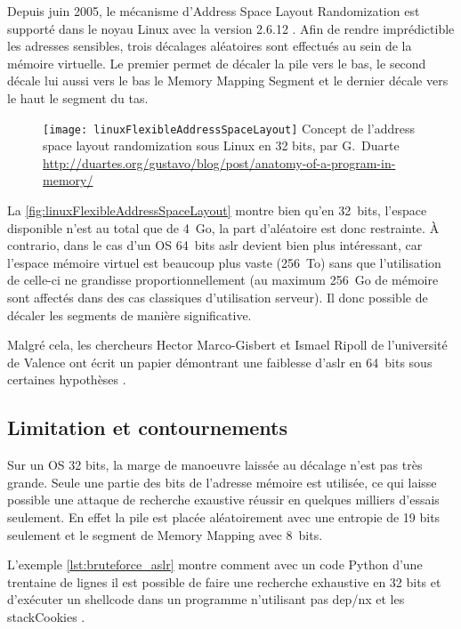 Depuis juin 2005, le mécanisme d'Address Space Layout Randomization est supporté dans le noyau Linux avec la version 2.6.12 \cite{AddressSpaceLayoutRandomizationFR, AddressSpaceLayoutRandomizationEN}. Afin de rendre imprédictible les adresses sensibles, trois décalages aléatoires sont effectués au sein de la mémoire virtuelle. Le premier permet de décaler la pile vers le bas, le second décale lui aussi vers le bas le \og Memory Mapping Segment \fg et le dernier décale vers le haut le segment du tas.

\begin{figure}[H]
	\centering
	\texttt{[image: linuxFlexibleAddressSpaceLayout]}
	{Concept de l'address space layout randomization sous Linux en 32 bits, par G.~Duarte}
	{\url{http://duartes.org/gustavo/blog/post/anatomy-of-a-program-in-memory/}}
	\label{fig:linuxFlexibleAddressSpaceLayout}
\end{figure}

La \autoref{fig:linuxFlexibleAddressSpaceLayout} montre bien qu'en 32~bits, l'espace disponible n'est au total que de 4~Go, la part d'aléatoire est donc restrainte. À contrario, dans le cas d'un OS 64~bits \gls{aslr} devient bien plus intéressant, car l'espace mémoire virtuel est beaucoup plus vaste (256~To) sans que l'utilisation de celle-ci ne grandisse proportionnellement (au maximum 256~Go de mémoire sont affectés dans des cas classiques d'utilisation serveur). Il donc possible de décaler les segments de manière significative.

Malgré cela, les chercheurs Hector Marco-Gisbert et Ismael Ripoll de l'université de Valence ont écrit un papier démontrant une faiblesse d'\gls{aslr} en 64~bits sous certaines hypothèses \cite{EffectivenessFullASLR64bit}.

\subsection{Limitation et contournements}

Sur un OS 32 bits, la marge de manoeuvre laissée au décalage n'est pas très grande. Seule une partie des bits de l'adresse mémoire est utilisée, ce qui laisse possible une attaque de recherche exaustive réussir en quelques milliers d'essais seulement. En effet la pile est placée aléatoirement avec une entropie de 19 bits seulement et le segment de \og Memory Mapping \fg avec 8~bits.

L'exemple \autoref{lst:bruteforce_aslr} montre comment avec un code Python d'une trentaine de lignes il est possible de faire une recherche exhaustive en 32 bits et d'exécuter un \og shellcode \fg dans un programme n'utilisant pas \gls{dep}/\gls{nx} et les \og \gls{stackCookies} \fg.

